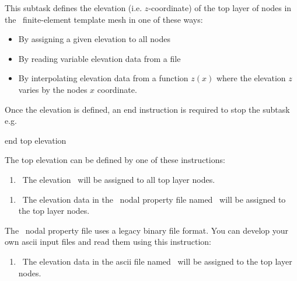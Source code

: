    {This subtask defines the elevation (i.e. $z$-coordinate) of the top layer of nodes in the \gwf\ finite-element template mesh in one of these ways:
     \begin{itemize}
        \item By assigning a given elevation to all nodes
        \item By reading variable elevation data from a file
        \item By interpolating elevation data from a function $z(x)$ where the elevation $z$ varies by the nodes $x$ coordinate.
     \end{itemize}
     Once the elevation is defined, an \textsf{end} instruction is required to stop the subtask e.g.\:

    {\Large \sf end top elevation}
    }

 The top elevation can be defined by one of these instructions: \label{'Page:TopElev'}

    {\squish
    \begin{enumerate}
    \item {}\  The elevation \ will be assigned to all top layer nodes.
    \end{enumerate}
    \squish
    }

    {\squish
    \begin{enumerate}
    \item {}\  The elevation data in the \gb\ nodal property file named \ will be assigned to the top layer nodes.
    \end{enumerate}
    \squish
    }

The \gb\ nodal property file uses a legacy binary file format. You can develop your own ascii input files and read them using this instruction:

    {\squish
    \begin{enumerate}
    \item {}\  The elevation data in the ascii file named  \ will be assigned to the top layer nodes.
    \end{enumerate}
    \squish
    }

